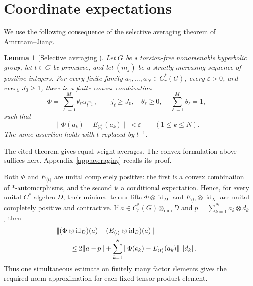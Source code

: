 \documentclass[11pt,letterpaper]{amsart}
\numberwithin{equation}{section}
\newtheorem{lemma}[theorem]{Lemma}
\theoremstyle{definition}
\theoremstyle{remark}
\newcommand{\Cr}{C_r^*}
\newcommand{\id}{\operatorname{id}}
\begin{document}
\section{Coordinate expectations}\label{sec:coordinates}

We use the following consequence of the selective averaging theorem
of Amrutam--Jiang.

\begin{lemma}[Selective averaging {\cite[Theorem~3.3 and Lemma 4.1]{AJ}}]
\label{lem:averaging}
Let $G$ be a torsion-free nonamenable hyperbolic group, let $t\in G$
be primitive, and let $(m_j)$ be a strictly increasing sequence of
positive integers. For every finite family $a_1,\ldots,a_N\in\Cr(G)$,
every $\varepsilon>0$, and every $J_0\ge1$, there is a finite convex
combination
\[
 \Phi=\sum_{\ell=1}^{M}\theta_\ell\alpha_{t^{m_{j_\ell}}},
 \qquad j_\ell\ge J_0,\quad
 \theta_\ell\ge0,\quad\sum_{\ell=1}^{M}\theta_\ell=1,
\]
such that
\[
 \|\Phi(a_k)-E_{\langle t\rangle}(a_k)\|<\varepsilon
 \qquad(1\le k\le N).
\]
The same assertion holds with $t$ replaced by $t^{-1}$.
\end{lemma}

The cited theorem gives equal-weight averages. The convex formulation
above suffices here. Appendix~\ref{app:averaging} recalls its proof.

Both $\Phi$ and $E_{\langle t\rangle}$ are unital completely positive:
the first is a convex combination of $*$-automorphisms, and the second
is a conditional expectation. Hence, for every unital $C^*$-algebra
$D$, their minimal tensor lifts $\Phi\otimes\id_D$ and
$E_{\langle t\rangle}\otimes\id_D$ are unital completely positive
and contractive. If
$a\in\Cr(G)\otimes_{\min}D$ and
$p=\sum_{k=1}^{N}a_k\otimes d_k$, then
\begin{align}
 &\|(\Phi\otimes\id_D)(a)
       -(E_{\langle t\rangle}\otimes\id_D)(a)\|\notag\\
 &\qquad\le
 2\|a-p\|+\sum_{k=1}^{N}
       \|\Phi(a_k)-E_{\langle t\rangle}(a_k)\|\,\|d_k\|.
 \label{eq:tensor}
\end{align}
Thus one simultaneous estimate on finitely many factor elements gives
the required norm approximation for each fixed tensor-product element.
\end{document}
